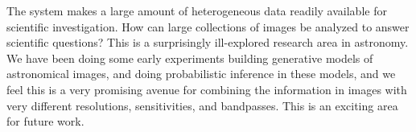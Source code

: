 The \an system makes a large amount of heterogeneous data readily
available for scientific investigation.  How can large collections of
images be analyzed to answer scientific questions?  This is a
surprisingly ill-explored research area in astronomy.  We have been
doing some early experiments building generative models of
astronomical images, and doing probabilistic inference in these
models, and we feel this is a very promising avenue for combining the
information in images with very different resolutions, sensitivities,
and bandpasses.  This is an exciting area for future work.


